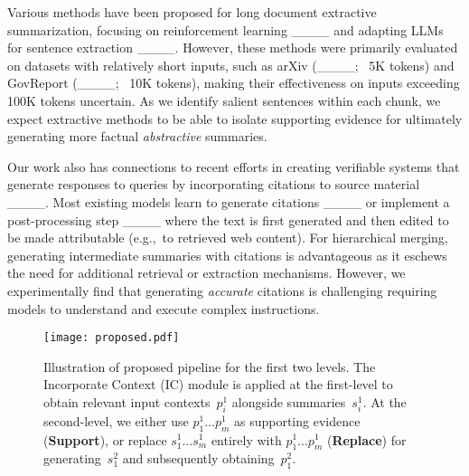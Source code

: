 Various methods have been proposed for long document extractive
summarization, focusing on reinforcement learning
____
and adapting LLMs for sentence extraction ____. However, these methods were primarily
evaluated on datasets with relatively short inputs, such as arXiv
(____; ~5K tokens) and GovReport
(____; ~10K tokens), making their
effectiveness on inputs exceeding 100K tokens uncertain. As we
identify salient sentences within each chunk, we expect extractive
methods to be able to isolate supporting evidence for ultimately
generating more factual \emph{abstractive} summaries.

Our work also  has connections to recent efforts in creating verifiable systems that generate responses to queries by incorporating citations to source material ____. Most existing models learn to generate citations ____ or implement a post-processing step ____ where the text is first generated and then edited to be made attributable (e.g.,~to retrieved web content).  For hierarchical merging, generating intermediate summaries with citations is advantageous as it  eschews the need for additional retrieval or extraction mechanisms. However, we experimentally find that generating \emph{accurate} citations is challenging requiring models to understand and execute complex instructions. 






\begin{figure}[t]
  \texttt{[image: proposed.pdf]}
  \caption{Illustration of proposed pipeline for the first two
    levels. The Incorporate Context (IC) module is applied at the
    first-level to obtain relevant input contexts~$p^1_i$ alongside
    summaries~$s^1_i$. At the \mbox{second-level}, we either use
    $p^1_1 \dots p^1_m$ as supporting evidence (\textbf{Support}), or
    replace $s^1_1 \dots s^1_m$ entirely with $p^1_1 \dots p^1_m$
    (\textbf{Replace}) for generating~$s^2_1$ and subsequently
    obtaining~$p^2_1$.}
  \label{fig:proposed}
\end{figure}

